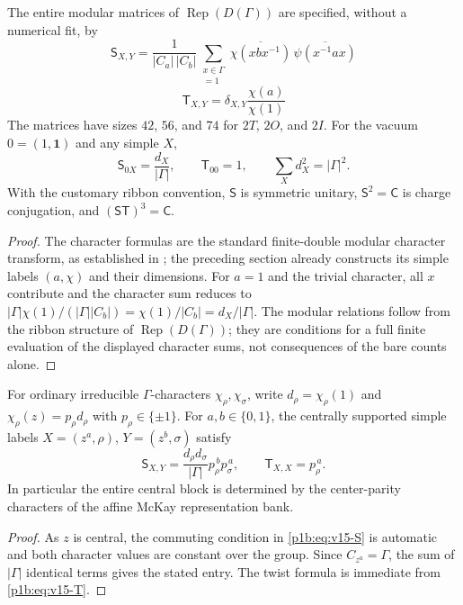 \documentclass[11pt]{article}
\begin{document}
\begin{theorem}
\label{p1b:thm:v15-untwisted-ST}
The entire modular matrices of $\operatorname{Rep}(D(\Gamma))$ are
specified, without a numerical fit, by
\begin{equation}
 \boxed{\mathsf S_{X,Y}
 =\frac{1}{|C_a|\,|C_b|}
 \sum_{\substack{x\in\Gamma\\ [a,xbx^{-1}]=1}}
 \overline{\chi(xbx^{-1})}\,
 \overline{\psi(x^{-1}ax)}}
 \tag{T15.4}\label{p1b:eq:v15-S}
\end{equation}
\begin{equation}
 \boxed{\mathsf T_{X,Y}
 =\delta_{X,Y}\frac{\chi(a)}{\chi(1)}}
 \tag{T15.5}\label{p1b:eq:v15-T}
\end{equation}
The matrices have sizes $42$, $56$, and $74$ for $2T$, $2O$, and $2I$.
For the vacuum $0=(1,\mathbf1)$ and any simple $X$,
\[
\mathsf S_{0X}=\frac{d_X}{|\Gamma|},\qquad
\mathsf T_{00}=1,\qquad
\sum_Xd_X^2=|\Gamma|^2.
\tag{T15.6}\label{p1b:eq:v15-vacuum-row}
\]
With the customary ribbon convention, $\mathsf S$ is symmetric unitary,
$\mathsf S^2=\mathsf C$ is charge conjugation, and
$(\mathsf S\mathsf T)^3=\mathsf C$.
\end{theorem}
\begin{proof}
The character formulas are the standard finite-double modular
character transform, as established in
\cite{CoquereauxZuber2013Doubles}; the preceding section already
constructs its simple labels $(a,\chi)$ and their dimensions.
For $a=1$ and the trivial character, all $x$ contribute and the
character sum reduces to
$|\Gamma|\chi(1)/(|\Gamma||C_b|)
=\chi(1)/|C_b|=d_X/|\Gamma|$.
The modular relations follow from the ribbon structure of
$\operatorname{Rep}(D(\Gamma))$; they are conditions for a
full finite evaluation of the displayed character sums, not
consequences of the bare counts alone.
\end{proof}

\begin{corollary}
\label{p1b:cor:v15-central-block}
For ordinary irreducible $\Gamma$-characters $\chi_\rho,\chi_\sigma$,
write $d_\rho=\chi_\rho(1)$ and
$\chi_\rho(z)=p_\rho d_\rho$ with $p_\rho\in\{\pm1\}$.
For $a,b\in\{0,1\}$, the centrally supported simple
labels $X=(z^a,\rho)$, $Y=(z^b,\sigma)$ satisfy
\[
\boxed{\mathsf S_{X,Y}=
 \frac{d_\rho d_\sigma}{|\Gamma|}
 p_\rho^{\,b}p_\sigma^{\,a},\qquad
 \mathsf T_{X,X}=p_\rho^{\,a}.}
\tag{T15.7}\label{p1b:eq:v15-central-block}
\]
In particular the entire central block is determined by the
center-parity characters of the affine McKay representation bank.
\end{corollary}
\begin{proof}
As $z$ is central, the commuting condition in
\eqref{p1b:eq:v15-S} is automatic and both character values are
constant over the group. Since $C_{z^a}=\Gamma$, the sum of
$|\Gamma|$ identical terms gives the stated entry. The twist
formula is immediate from \eqref{p1b:eq:v15-T}.
\end{proof}
\end{document}
